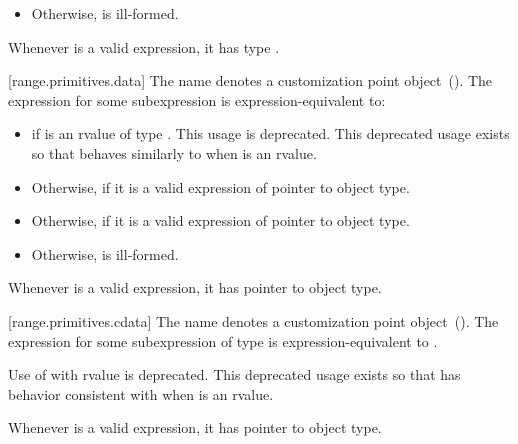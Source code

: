 {\begin{itemize}
\item
  Otherwise,  is ill-formed.
\end{itemize}

\pnum
\enternote Whenever  is a valid expression, it
has type . \exitnote

[range.primitives.data]{}
\pnum
The name  denotes a customization point
object~(). The expression
 for some subexpression  is
expression-equivalent to:

\begin{itemize}
\item
   if  is an rvalue of
  type . This usage is deprecated. \enternote
  This deprecated usage exists so that  behaves
  similarly to   when  is an rvalue. \exitnote

\item
  Otherwise,  if it is a valid expression of pointer to object type.

\item
  Otherwise,  if it is a valid expression of pointer to object type.

\item
  Otherwise,  is ill-formed.
\end{itemize}

\pnum
\enternote Whenever  is a valid expression, it
has pointer to object type. \exitnote

[range.primitives.cdata]{}
\pnum
The name  denotes a customization point
object~(). The expression
 for some subexpression  of type 
is expression-equivalent to .

\pnum
Use of  with rvalue  is deprecated.
\enternote This deprecated usage exists so that 
has behavior consistent with  when  is
an rvalue. \exitnote

\pnum
\enternote Whenever  is a valid expression, it
has pointer to object type. \exitnote

}
